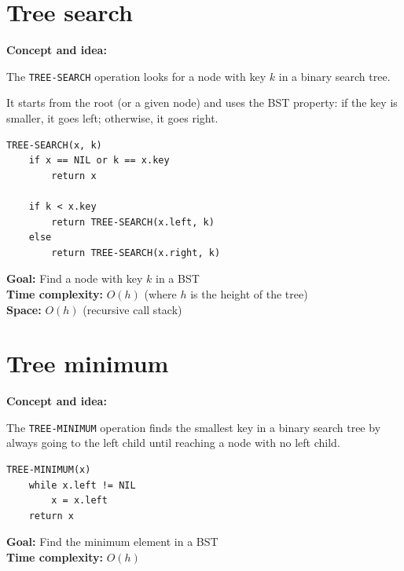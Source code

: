 \documentclass[11pt,a4paper,openany]{book}
\begin{document}
\vspace{2cm}




\section{Tree search}
\textbf{Concept and idea:}

The \texttt{TREE-SEARCH} operation looks for a node with key $k$ in a binary search tree.

It starts from the root (or a given node) and uses the BST property:
if the key is smaller, it goes left; otherwise, it goes right.

\begin{lstlisting}
TREE-SEARCH(x, k)
    if x == NIL or k == x.key
        return x

    if k < x.key
        return TREE-SEARCH(x.left, k)
    else
        return TREE-SEARCH(x.right, k)
\end{lstlisting}

\textbf{Goal:} Find a node with key $k$ in a BST \\

\textbf{Time complexity:} $O(h)$ (where $h$ is the height of the tree) \\

\textbf{Space:} $O(h)$ (recursive call stack)









\vspace{2cm}




\section{Tree minimum}

\textbf{Concept and idea:}

The \texttt{TREE-MINIMUM} operation finds the smallest key in a binary search tree by always going to the left child until reaching a node with no left child.

\begin{lstlisting}
TREE-MINIMUM(x)
    while x.left != NIL
        x = x.left
    return x
\end{lstlisting}

\textbf{Goal:} Find the minimum element in a BST \\

\textbf{Time complexity:} $O(h)$ \\
\end{document}
